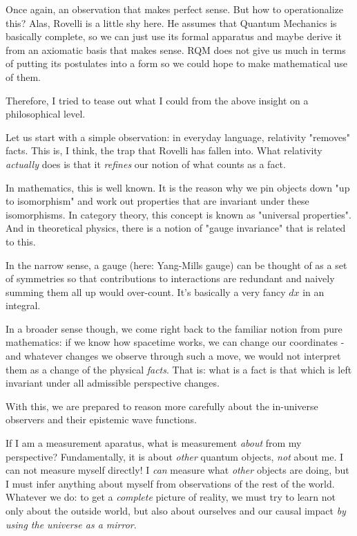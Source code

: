\documentclass{article}
\begin{document}
Once again, an observation that makes perfect sense. But how to operationalize this? Alas, Rovelli is a little shy here. He assumes that Quantum Mechanics is basically complete, so we can just use its formal apparatus and maybe derive it from an axiomatic basis that makes sense. RQM does not give us much in terms of putting its postulates into a form so we could hope to make mathematical use of them.

Therefore, I tried to tease out what I could from the above insight on a philosophical level.

Let us start with a simple observation: in everyday language, relativity "removes" facts. This is, I think, the trap that Rovelli has fallen into. What relativity \textit{actually} does is that it \textit{refines} our notion of what counts as a fact.

In mathematics, this is well known. It is the reason why we pin objects down "up to isomorphism" and work out properties that are invariant under these isomorphisms. In category theory, this concept is known as "universal properties". And in theoretical physics, there is a notion of "gauge invariance" that is related to this.

In the narrow sense, a gauge (here: Yang-Mills gauge) can be thought of as a set of symmetries so that contributions to interactions are redundant and naively summing them all up would over-count. It's basically a very fancy $dx$ in an integral.

In a broader sense though, we come right back to the familiar notion from pure mathematics: if we know how spacetime works, we can change our coordinates - and whatever changes we observe through such a move, we would not interpret them as a change of the physical \textit{facts}. That is: what is a fact is that which is left invariant under all admissible perspective changes.

With this, we are prepared to reason more carefully about the in-universe observers and their epistemic wave functions.

If I am a measurement aparatus, what is measurement \textit{about} from my perspective? Fundamentally, it is about \textit{other} quantum objects, \textit{not} about me. I can not measure myself directly! I \textit{can} measure what \textit{other} objects are doing, but I must infer anything about myself from observations of the rest of the world. Whatever we do: to get a \textit{complete} picture of reality, we must try to learn not only about the outside world, but also about ourselves and our causal impact \textit{by using the universe as a mirror}.
\end{document}
